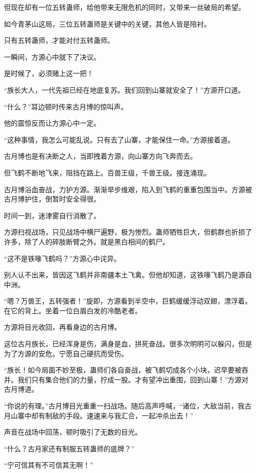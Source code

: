\begin{this_body}
但现在却有一位五转蛊师，给他带来无限危机的同时，又带来一丝破局的希望。

如今青茅山这局，三位五转蛊师是关键中的关键，其他人皆是陪衬。

只有五转蛊师，才能对付五转蛊师。

一瞬间，方源心中就下了决议。

是时候了，必须赌上这一把！

“族长大人，一代先祖已经在地底复苏。我们回到山寨就安全了！”方源开口道。

“什么？”耳边顿时传来古月博的惊叫声。

他的震惊反而让方源心中一定。

“这种事情，我怎么可能乱说。只有去了山寨，才能保住一命。”方源接着道。

古月博也是有决断之人，当即拽着方源，向山寨方向飞奔而去。

但飞鹤不断地飞来，阻挡在路上。百兽王级，千兽王级。接连涌现。

古月博浴血奋战，力护方源。渐渐举步维艰，陷入到飞鹤的重重包围当中。方源被古月博护住，倒暂时安全得很。

时间一到，迷津雾自行消散了。

方源扫视战场，只见战场中横尸遍野，极为惨烈。蛊师牺牲巨大，但鹤群也折损了许多，除了人的碎肢断臂之外。就是黑白相间的鹤尸。

“这不是铁喙飞鹤吗？”方源心中诧异。

别人认不出来，皆因这飞鹤并非南疆本土飞禽。但他却知道，这铁喙飞鹤乃是源自中洲。

“嗯？万兽王，五转强者！”旋即，方源看到半空中，巨鹤缓缓浮动双翅，漂浮着。在它的背上。坐着一位白眉白发的冷酷老者。

方源将目光收回，再看身边的古月博。

这位古月族长，已经浑身是伤，满身是血，拼死奋战。很多次明明可以躲闪，但是为了方源的安危。宁愿自己硬抗而受伤。

“族长！如今局面不妙至极，蛊师们各自奋战，被飞鹤切成各个小块，迟早要被吞并。我们只有集合他们的力量，拧成一股。才有望冲出重围，回到山寨！”方源对古月博道。

“你说的有理。”古月博目光重重一扫战场。随后高声呼喊，“诸位，大敌当前，我古月山寨中却有制敌的手段。速速来与我汇合，一起冲杀出去！”

声音在战场中回荡，顿时吸引了无数的目光。

“什么？古月家还有制服五转蛊师的底牌？”

“宁可信其有不可信其无啊！”


\end{this_body}
